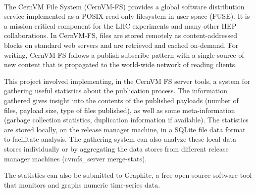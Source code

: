 \paragraph{}
The CernVM File System (CernVM-FS) provides a global software distribution service implemented as a POSIX read-only filesystem
in user space (FUSE). It is a mission critical component for the LHC experiments and many other HEP collaborations. In CernVM-FS,
files are stored remotely as content-addressed blocks on standard web servers and are
retrieved and cached on-demand. For writing, CernVM-FS follows a publish-subscribe pattern with a single source of new content that
is propagated to the world-wide network of reading clients.
\par 
This project involved implementing, in the CernVM FS server tools, a system for gathering useful statistics about the publication process. The information gathered gives insight into the contents of the published payloads (number of files, payload size, type of files published), as well as some meta-information (garbage collection
statistics, duplication information if available). The statistics are stored locally, on the release manager machine, in a SQLite file data format to facilitate analysis. The gathering system can also analyze these local data stores individually or by aggregating the data stores from different release manager machines (cvmfs\_server merge-stats).
\par
The statistics can also be submitted to Graphite, a free open-source software tool that monitors and graphs numeric time-series data. 